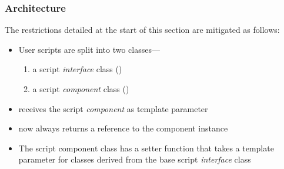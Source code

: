 \documentclass{projdoc}
\begin{document}
\subsubsection{Architecture}
\label{sec:scripts:architecture}

The restrictions detailed at the start of this section are mitigated as
follows:\noparbreak

\begin{itemize}
	\item User scripts are split into two classes---
		\begin{enumerate}
			\item a script \emph{interface} class ()
			\item a script \emph{component} class ()
		\end{enumerate}
	\item {} receives the script \emph{component}
		as template parameter
	\item {} now always returns a reference to the
		component instance
	\item The script component class has a setter function that takes a template
		parameter for classes derived from the base script \emph{interface} class
\end{itemize}
\end{document}
